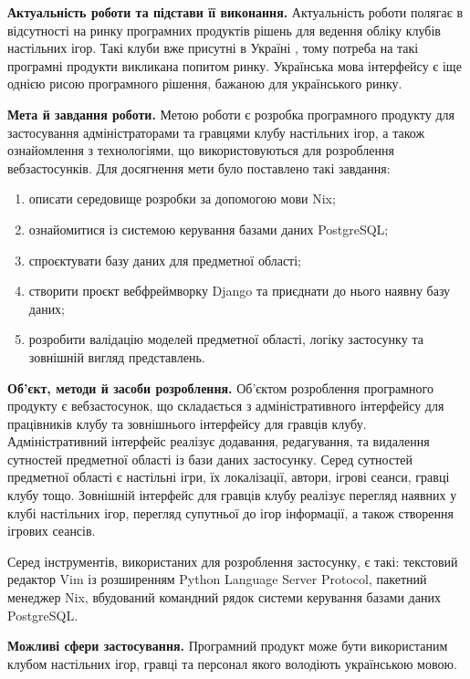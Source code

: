 \documentclass[a4paper, 14pt]{extarticle}
\begin{document}
  \textbf{Актуальність роботи та підстави її виконання.}
  Актуальність роботи полягає в відсутності на ринку програмних продуктів рішень
  для ведення обліку клубів настільних ігор. Такі клуби вже присутні в Україні \cite{igromag},
  тому потреба на такі програмні продукти викликана попитом ринку. Українська мова
  інтерфейсу є іще однією рисою програмного рішення, бажаною для українського ринку.


  \textbf{Мета й завдання роботи.}
  Метою роботи є розробка програмного продукту для застосування адміністраторами
  та гравцями клубу настільних ігор, а також ознайомлення з технологіями, що
  використовуються для розроблення вебзастосунків. Для досягнення мети було поставлено
  такі завдання:

  \begin{enumerate}[nosep, label=\arabic*)]
    \item описати середовище розробки за допомогою мови Nix;
    \item ознайомитися із системою керування базами даних PostgreSQL;
    \item спроєктувати базу даних для предметної області;
    \item створити проєкт вебфреймворку Django та приєднати до нього наявну базу даних;
    \item розробити валідацію моделей предметної області, логіку застосунку та зовнішній
      вигляд представлень.
  \end{enumerate}

  \textbf{Об’єкт, методи й засоби розроблення.}
  Об'єктом розроблення програмного продукту є вебзастосунок, що складається
  з адміністративного інтерфейсу для працівників клубу та зовнішнього інтерфейсу
  для гравців клубу. Адміністративний інтерфейс реалізує додавання, редагування,
  та видалення сутностей предметної області із бази даних застосунку. Серед
  сутностей предметної області є настільні ігри, їх локалізації, автори, ігрові сеанси,
  гравці клубу тощо. Зовнішній інтерфейс для гравців клубу реалізує перегляд наявних
  у клубі настільних ігор, перегляд супутньої до ігор інформації, а також створення
  ігрових сеансів.

  Серед інструментів, використаних для розроблення застосунку, є такі: текстовий редактор
  Vim із розширенням Python Language Server Protocol,
  пакетний менеджер Nix, вбудований командний рядок системи керування базами даних
  PostgreSQL.

  \textbf{Можливі сфери застосування.}
  Програмний продукт може бути використаним клубом настільних ігор, гравці та персонал
  якого володіють українською мовою.
\end{document}
